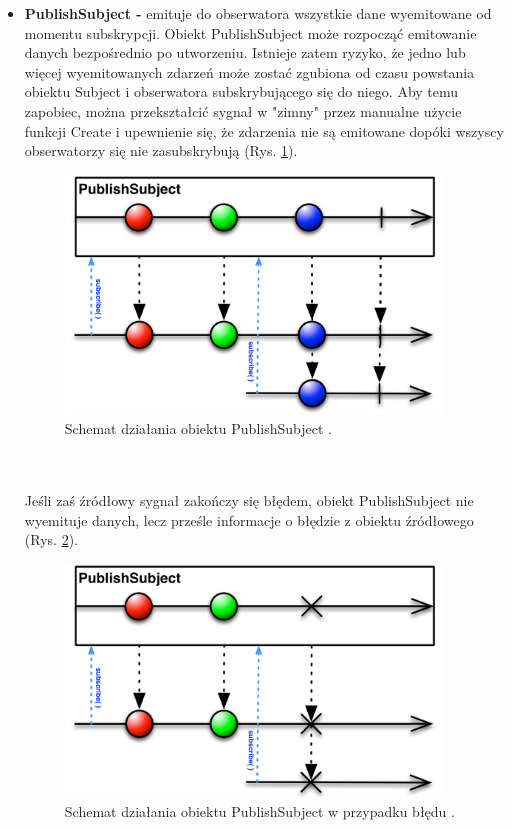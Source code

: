 \documentclass[12pt,oneside,a4paper]{report}
\begin{document}
\begin{itemize}
	\item \textbf{PublishSubject -} emituje do obserwatora wszystkie dane wyemitowane od momentu subskrypcji. Obiekt PublishSubject może rozpocząć emitowanie danych bezpośrednio po utworzeniu. Istnieje zatem ryzyko, że jedno lub więcej wyemitowanych zdarzeń może zostać zgubiona od czasu powstania obiektu Subject i obserwatora subskrybującego się do niego. Aby temu zapobiec, można przekształcić sygnał w "zimny" przez manualne użycie funkcji Create i upewnienie się, że zdarzenia nie są emitowane dopóki wszyscy obserwatorzy się nie zasubskrybują (Rys. \ref{publishSubject}). 
	\begin{figure}[ht!]
		\centering
		\includegraphics[width=10cm]{publishSubject}
		\caption{Schemat działania obiektu PublishSubject \cite{subjects}.}
		\label{publishSubject}
	\end{figure}
	\\
	\\ 
	Jeśli zaś źródłowy sygnał zakończy się błędem, obiekt PublishSubject nie wyemituje danych, lecz prześle informacje o błędzie z obiektu źródłowego (Rys. \ref{publishSubjectFailed}).
	\begin{figure}[ht!]
		\centering
		\includegraphics[width=10cm]{publishSubjectFailed}
		\caption{Schemat działania obiektu PublishSubject w przypadku błędu \cite{subjects}.}
		\label{publishSubjectFailed}
	\end{figure}
	

\end{itemize}
\end{document}
